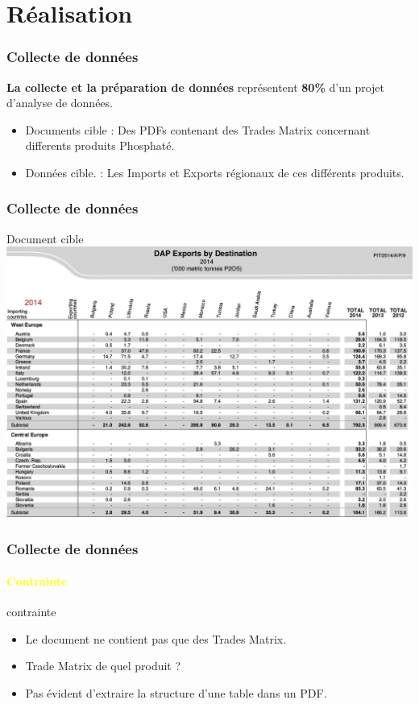 \documentclass{beamer}
\begin{document}
\section{Réalisation}

\begin{frame}
  \frametitle{Collecte de données}
  \textbf{La collecte et la préparation de données} représentent \textbf{80\%} d'un projet d'analyse de données.\\
  \begin{itemize}
    \item Documents cible : Des PDFs contenant des Trades Matrix concernant differents produits Phosphaté.
    \item Données cible. : Les Imports et Exports régionaux de ces différents produits.
  \end{itemize}
\end{frame}

\begin{frame}
  \frametitle{Collecte de données}
	\begin{block}{Document cible}
    		\includegraphics[width=\textwidth, height=0.8\textheight, keepaspectratio]{DocIFA}
	\end{block}
\end{frame}

\begin{frame}
  \frametitle{Collecte de données}
  \framesubtitle{\textbf{\textcolor{yellow}{Contrainte}}}
  \begin{block}{contrainte}
  	\begin{itemize}
    		\item Le document ne contient pas que des Trades Matrix.
    		\item Trade Matrix de quel produit ?
    		\item Pas évident d'extraire la structure d'une table dans un PDF.
  	\end{itemize}
  \end{block}
\end{frame}
\end{document}
